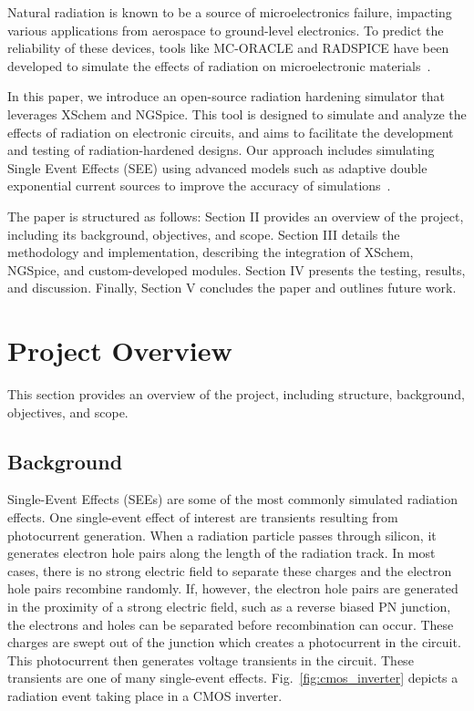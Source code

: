 \documentclass[conference]{IEEEtran}
\begin{document}
    Natural radiation is known to be a source of microelectronics failure, impacting various applications from aerospace to ground-level electronics.
    To predict the reliability of these devices, tools like MC-ORACLE and RADSPICE have been developed to simulate the effects of radiation on microelectronic materials~\cite{Wrobel2011, Florian1986}.

    In this paper, we introduce an open-source radiation hardening simulator that leverages XSchem and NGSpice.
    This tool is designed to simulate and analyze the effects of radiation on electronic circuits, and aims to facilitate the development and testing of radiation-hardened designs.
    Our approach includes simulating Single Event Effects (SEE) using advanced models such as adaptive double exponential current sources to improve the accuracy of simulations~\cite{Pepper1990}.

    The paper is structured as follows: Section II provides an overview of the project, including its background, objectives, and scope.
    Section III details the methodology and implementation, describing the integration of XSchem, NGSpice, and custom-developed modules.
    Section IV presents the testing, results, and discussion.
    Finally, Section V concludes the paper and outlines future work.


    \section{Project Overview}\label{sec:project-overview}
    This section provides an overview of the project, including structure, background, objectives, and scope.

    \subsection{Background}\label{subsec:background}
    
   	Single-Event Effects (SEEs) are some of the most commonly simulated radiation effects. One single-event effect of interest are transients resulting from photocurrent generation. When a radiation particle passes through silicon, it generates electron hole pairs along the length of the radiation track. In most cases, there is no strong electric field to separate these charges and the electron hole pairs recombine randomly. If, however, the electron hole pairs are generated in the proximity of a strong electric field, such as a reverse biased PN junction, the electrons and holes can be separated before recombination can occur. These charges are swept out of the junction which creates a photocurrent in the circuit. This photocurrent then generates voltage transients in the circuit. These transients are one of many single-event effects. Fig.~\ref{fig:cmos_inverter} depicts a radiation event taking place in a CMOS inverter.
    
\end{document}
